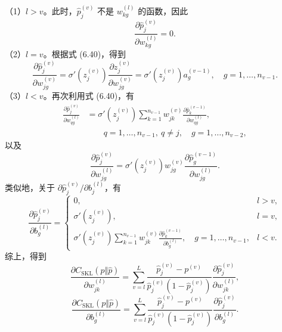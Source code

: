 （1）$l>v$。此时，$\widehat p_j^{(v)}$ 不是 $w_{kg}^{(l)}$ 的函数，因此
\begin{equation}
\frac{\partial\widehat p_j^{(v)}}{\partial w_{kg}^{(l)}}=0.
\tag{6.75}
\end{equation}
（2）$l=v$。根据式 (6.40)，得到
\begin{equation}
\frac{\partial\widehat p_j^{(v)}}{\partial w_{jg}^{(v)}}=\sigma'(z_j^{(v)})\frac{\partial z_j^{(v)}}{\partial w_{jg}^{(v)}}=
\sigma'(z_j^{(v)})a_g^{(v-1)},\quad g=1,\ldots,n_{v-1}.
\tag{6.76}
\end{equation}
（3）$l<v$。再次利用式 (6.40)，有
\begin{equation}
\begin{aligned}
\frac{\partial\widehat p_j^{(v)}}{\partial w_{qg}^{(l)}}&=\sigma'(z_j^{(v)})\sum_{k=1}^{n_{v-1}}w_{jk}^{(v)}\frac{\partial\widehat p_k^{(v-1)}}{\partial w_{qg}^{(l)}},\\
&\qquad q=1,\ldots,n_{v-1},\ q\ne j,\quad g=1,\ldots,n_{v-2},
\end{aligned}\tag{6.77}
\end{equation}
以及
\begin{equation}
\frac{\partial\widehat p_j^{(v)}}{\partial w_{jg}^{(l)}}=\sigma'(z_j^{(v)})w_{jg}^{(v)}\frac{\partial\widehat p_g^{(v-1)}}{\partial w_{jg}^{(l)}}.
\tag{6.78}
\end{equation}
类似地，关于 $\partial\widehat p_j^{(v)}/\partial b_j^{(l)}$，有
\begin{equation}
\frac{\partial\widehat p_j^{(v)}}{\partial b_g^{(l)}}=
\begin{cases}
0,&l>v,\\
\sigma'(z_j^{(v)}),&l=v,\\
\sigma'(z_j^{(v)})\displaystyle\sum_{k=1}^{n_{v-1}}w_{jk}^{(v)}
\frac{\partial\widehat p_k^{(v-1)}}{\partial b_g^{(l)}},\quad g=1,\ldots,n_{v-1},&l<v.
\end{cases}
\tag{6.79}
\end{equation}
综上，得到
\begin{equation}
\frac{\partial C_{\mathrm{SKL}}(p\Vert\widehat p)}{\partial w_{jk}^{(l)}}=
\sum_{v=l}^L\frac{\widehat p_j^{(v)}-p^{(v)}}{\widehat p_j^{(v)}(1-\widehat p_j^{(v)})}\frac{\partial\widehat p_j^{(v)}}{\partial w_{jk}^{(l)}},
\tag{6.80}
\end{equation}
\begin{equation}
\frac{\partial C_{\mathrm{SKL}}(p\Vert\widehat p)}{\partial b_g^{(l)}}=
\sum_{v=l}^L\frac{\widehat p_j^{(v)}-p^{(v)}}{\widehat p_j^{(v)}(1-\widehat p_j^{(v)})}\frac{\partial\widehat p_j^{(v)}}{\partial b_g^{(l)}}.
\tag{6.81}
\end{equation}
